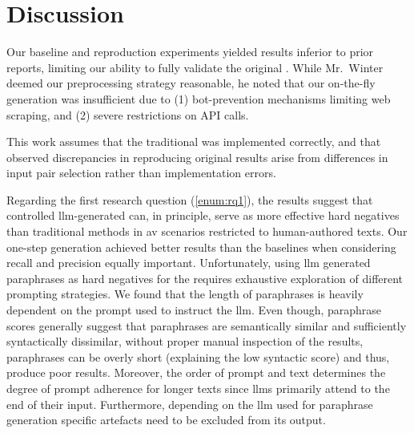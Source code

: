\chapter{Discussion}
\label{chap:discussion}

Our baseline and reproduction experiments yielded results inferior to prior reports, limiting our ability to fully validate the original \impAppr{}. 
While Mr.~Winter deemed our preprocessing strategy reasonable, he noted that our on-the-fly \imp{} generation was insufficient due to (1) bot-prevention mechanisms limiting web scraping, and (2) severe restrictions on API calls. 

This work assumes that the traditional \impAppr{} was implemented correctly, and that observed discrepancies in reproducing original results arise from differences in input pair selection rather than implementation errors. 

Regarding the first research question (\autoref{enum:rq1}), the results suggest that controlled \ac{llm}-generated \imps{} can, in principle, serve as more effective hard negatives than traditional methods in \ac{av} scenarios restricted to human-authored texts. 
Our one-step \imp{} generation achieved better results than the baselines when considering recall and precision equally important. 
Unfortunately, using \ac{llm} generated paraphrases as hard negatives for the \impAppr{} requires exhaustive exploration of different prompting strategies.
We found that the length of paraphrases is heavily dependent on the prompt used to instruct the \ac{llm}.
Even though, paraphrase scores generally suggest that paraphrases are semantically similar and sufficiently syntactically dissimilar, without proper manual inspection of the results, paraphrases can be overly short (explaining the low syntactic score) and thus, produce poor \impAppr{} results.
Moreover, the order of prompt and text determines the degree of prompt adherence for longer texts since \acp{llm} primarily attend to the end of their input.
Furthermore, depending on the \ac{llm} used for paraphrase generation specific artefacts need to be excluded from its output.

